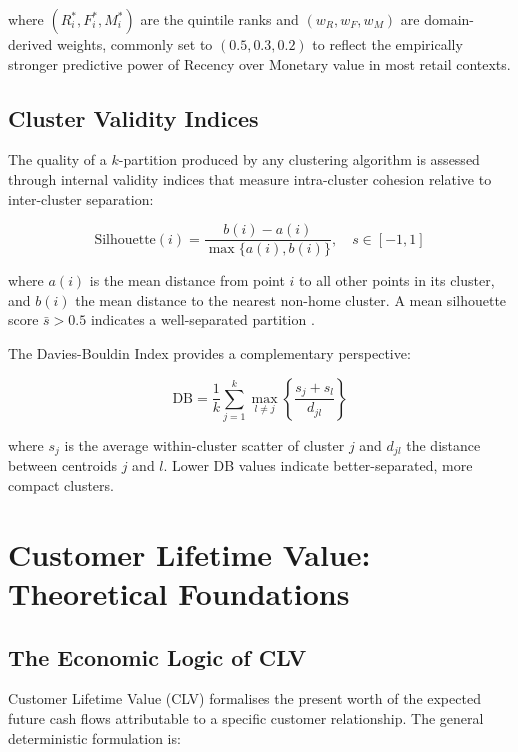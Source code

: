 where $(R_i^*, F_i^*, M_i^*)$ are the quintile ranks and $(w_R, w_F, w_M)$ are domain-derived weights, commonly set to $(0.5, 0.3, 0.2)$ to reflect the empirically stronger predictive power of Recency over Monetary value in most retail contexts.

\subsection{Cluster Validity Indices}

The quality of a $k$-partition produced by any clustering algorithm is assessed through internal validity indices that measure intra-cluster cohesion relative to inter-cluster separation:

\begin{equation}
    \text{Silhouette}(i) = \frac{b(i) - a(i)}{\max\{a(i), b(i)\}}, \quad s \in [-1, 1]
    \label{eq:silhouette}
\end{equation}

where $a(i)$ is the mean distance from point $i$ to all other points in its cluster, and $b(i)$ the mean distance to the nearest non-home cluster. A mean silhouette score $\bar{s} > 0.5$ indicates a well-separated partition \cite{jain1999data}.

The Davies-Bouldin Index provides a complementary perspective:

\begin{equation}
    \text{DB} = \frac{1}{k} \sum_{j=1}^k \max_{l \neq j} \left\{ \frac{s_j + s_l}{d_{jl}} \right\}
    \label{eq:db_index}
\end{equation}

where $s_j$ is the average within-cluster scatter of cluster $j$ and $d_{jl}$ the distance between centroids $j$ and $l$. Lower DB values indicate better-separated, more compact clusters.

\section{Customer Lifetime Value: Theoretical Foundations}

\subsection{The Economic Logic of CLV}

Customer Lifetime Value (CLV) formalises the present worth of the expected future cash flows attributable to a specific customer relationship. The general deterministic formulation is:

